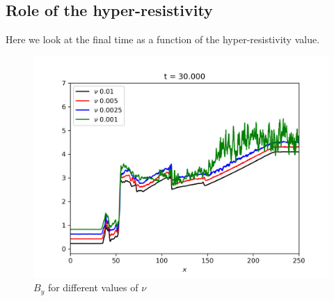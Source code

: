 \subsection{Role of the hyper-resistivity}

Here we look at the final time as a function of the hyper-resistivity value.


\begin{figure}[!t]
\centering
\includegraphics{shock/shock_By_nu}
\caption{$B_y$ for different values of $\nu$}
\label{fig:shock_bspline_order}
\end{figure}



